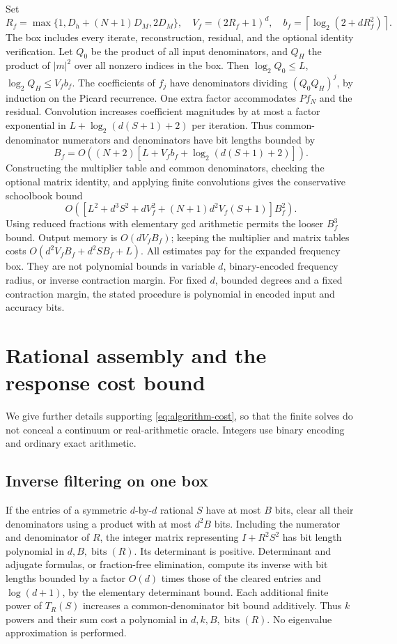 \documentclass[11pt,a4paper]{article}
\numberwithin{equation}{section}
\theoremstyle{definition}
\theoremstyle{remark}\newtheorem{remark}[theorem]{Remark}
\newcommand{\Id}{I}
\begin{document}
Set
\[
 R_f=\max\{1,D_h+(N+1)D_M,2D_M\},\quad
 V_f=(2R_f+1)^d,\quad
 b_f=\left\lceil\log_2(2+dR_f^2)\right\rceil.
\]
The box includes every iterate, reconstruction, residual, and the
optional identity verification.
Let \(Q_0\) be the product of all input denominators, and \(Q_H\)
the product of \(|m|^2\) over all nonzero indices in the box.
Then \(\log_2Q_0\leq L\), \(\log_2Q_H\leq V_fb_f\).
The coefficients of \(f_j\) have denominators dividing
\((Q_0Q_H)^j\), by induction on the Picard recurrence.
One extra factor accommodates \(Pf_N\) and the residual.
Convolution increases coefficient magnitudes by at most a factor
exponential in \(L+\log_2(d(S+1)+2)\) per iteration.
Thus common-denominator numerators and denominators have bit lengths
bounded by
\[
 B_f=O\!\left((N+2)
       [L+V_fb_f+\log_2(d(S+1)+2)]\right).
\]
Constructing the multiplier table and common denominators, checking
the optional matrix identity, and applying finite convolutions gives
the conservative schoolbook bound
\[
 O\!\left(
 [L^2+d^3S^2+dV_f^2+(N+1)d^2V_f(S+1)]B_f^2
 \right).
\]
Using reduced fractions with elementary gcd arithmetic permits the
looser \(B_f^3\) bound. Output memory is \(O(dV_fB_f)\);
keeping the multiplier and matrix tables costs
\(O(d^2V_fB_f+d^2SB_f+L)\).
All estimates pay for the expanded frequency box.
They are not polynomial bounds in variable \(d\), binary-encoded
frequency radius, or inverse contraction margin.
For fixed \(d\), bounded degrees and a fixed contraction margin,
the stated procedure is polynomial in encoded input and accuracy bits.

\section{Rational assembly and the response cost bound}\label{app:bit-costs}

We give further details supporting \eqref{eq:algorithm-cost}, so that
the finite solves do not conceal a continuum or real-arithmetic oracle.
Integers use binary encoding and ordinary exact arithmetic.

\subsection{Inverse filtering on one box}

If the entries of a symmetric \(d\)-by-\(d\) rational \(S\) have
at most \(B\) bits, clear all their denominators using a product
with at most \(d^2B\) bits. Including the numerator and denominator
of \(R\), the integer matrix representing \(\Id+R^2S^2\) has
bit length polynomial in \(d,B,\operatorname{bits}(R)\).
Its determinant is positive. Determinant and adjugate formulas,
or fraction-free elimination, compute its inverse with bit lengths
bounded by a factor \(O(d)\) times those of the cleared entries
and \(\log(d+1)\), by the elementary determinant bound.
Each additional finite power of \(T_R(S)\) increases a
common-denominator bit bound additively. Thus \(k\) powers and their
sum cost a polynomial in \(d,k,B,\operatorname{bits}(R)\).
No eigenvalue approximation is performed.
\end{document}
